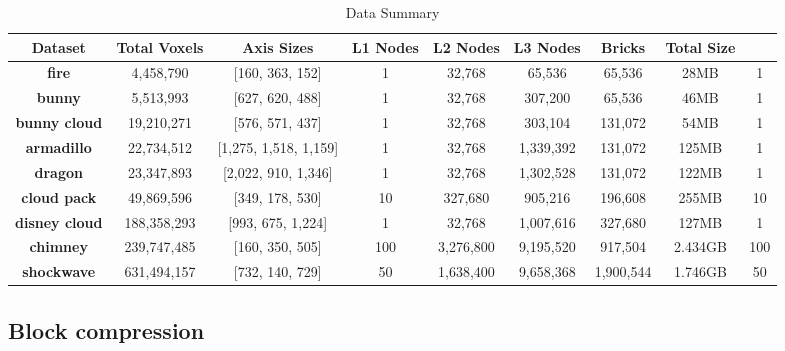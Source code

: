 \begin{table}[htbp]
    \centering
    \caption{Data Summary}
    \label{tab:data-summary}
    \begin{tabularx}{\textwidth}{|c|c|c|c|c|c|c|c|c|}
    \hline
    \textbf{Dataset} & \textbf{Total Voxels} & \textbf{Axis Sizes} & \textbf{L1 Nodes} & \textbf{L2 Nodes} & \textbf{L3 Nodes} & \textbf{Bricks} & \textbf{Total Size} \\
    \hline
    \textbf{fire} & 4,458,790 & [160, 363, 152] & 1 & 32,768 & 65,536 & 65,536 & 28MB & 1 \\
    \hline
    \textbf{bunny} & 5,513,993 & [627, 620, 488] & 1 & 32,768 & 307,200 & 65,536 & 46MB & 1 \\
    \hline
    \textbf{bunny cloud} & 19,210,271 & [576, 571, 437] & 1 & 32,768 & 303,104 & 131,072 & 54MB & 1 \\
    \hline
    \textbf{armadillo} & 22,734,512 & [1,275, 1,518, 1,159] & 1 & 32,768 & 1,339,392 & 131,072 & 125MB & 1 \\
    \hline
    \textbf{dragon} & 23,347,893 & [2,022, 910, 1,346] & 1 & 32,768 & 1,302,528 & 131,072 & 122MB & 1 \\
    \hline
    \textbf{cloud pack} & 49,869,596 & [349, 178, 530] & 10 & 327,680 & 905,216 & 196,608 & 255MB & 10 \\
    \hline
    \textbf{disney cloud} & 188,358,293 & [993, 675, 1,224] & 1 & 32,768 & 1,007,616 & 327,680 & 127MB & 1 \\
    \hline
    \textbf{chimney} & 239,747,485 & [160, 350, 505] & 100 & 3,276,800 & 9,195,520 & 917,504 & 2.434GB & 100 \\
    \hline
    \textbf{shockwave} & 631,494,157 & [732, 140, 729] & 50 & 1,638,400 & 9,658,368 & 1,900,544 & 1.746GB & 50 \\
    \hline
    \end{tabularx}
\end{table}

\subsection{Block compression} \label{results:block_compression}

\begin{figure}[H]
    \centering

    \caption{} \label{fig:implementation:compression:bc}
\end{figure}
